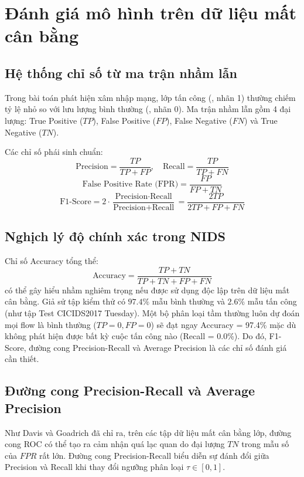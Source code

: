 \section{Đánh giá mô hình trên dữ liệu mất cân bằng}

\subsection{Hệ thống chỉ số từ ma trận nhầm lẫn}
Trong bài toán phát hiện xâm nhập mạng, lớp tấn công (\Attack, nhãn 1) thường chiếm tỷ lệ nhỏ so với lưu lượng bình thường (\Normal, nhãn 0). Ma trận nhầm lẫn gồm 4 đại lượng: True Positive ($TP$), False Positive ($FP$), False Negative ($FN$) và True Negative ($TN$).

Các chỉ số phái sinh chuẩn:
\begin{equation}
    \text{Precision} = \frac{TP}{TP + FP}, \quad \text{Recall} = \frac{TP}{TP + FN}
\end{equation}
\begin{equation}
    \text{False Positive Rate (FPR)} = \frac{FP}{FP + TN}
\end{equation}
\begin{equation}
    \text{F1-Score} = 2 \cdot \frac{\text{Precision} \cdot \text{Recall}}{\text{Precision} + \text{Recall}} = \frac{2TP}{2TP + FP + FN}
\end{equation}

\subsection{Nghịch lý độ chính xác trong NIDS}
Chỉ số Accuracy tổng thể:
\begin{equation}
    \text{Accuracy} = \frac{TP + TN}{TP + TN + FP + FN}
\end{equation}
có thể gây hiểu nhầm nghiêm trọng nếu được sử dụng độc lập trên dữ liệu mất cân bằng. Giả sử tập kiểm thử có $97.4\%$ mẫu bình thường và $2.6\%$ mẫu tấn công (như tập Test CICIDS2017 Tuesday). Một bộ phân loại tầm thường luôn dự đoán mọi flow là bình thường ($TP=0, FP=0$) sẽ đạt ngay Accuracy = 97.4\% mặc dù không phát hiện được bất kỳ cuộc tấn công nào (Recall = 0.0\%). Do đó, F1-Score, đường cong Precision-Recall và Average Precision là các chỉ số đánh giá cần thiết.

\subsection{Đường cong Precision-Recall và Average Precision}
Như Davis và Goadrich \cite{davis2006relationship} đã chỉ ra, trên các tập dữ liệu mất cân bằng lớp, đường cong ROC có thể tạo ra cảm nhận quá lạc quan do đại lượng $TN$ trong mẫu số của $FPR$ rất lớn. Đường cong Precision-Recall biểu diễn sự đánh đổi giữa Precision và Recall khi thay đổi ngưỡng phân loại $\tau \in [0, 1]$.

